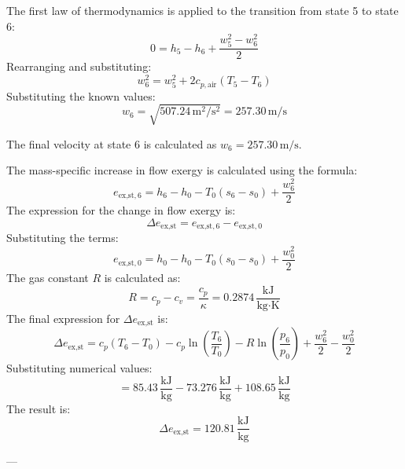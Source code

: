 The first law of thermodynamics is applied to the transition from state 5 to state 6:  
\[
0 = h_5 - h_6 + \frac{w_5^2 - w_6^2}{2}
\]  
Rearranging and substituting:  
\[
w_6^2 = w_5^2 + 2 c_{p,\text{air}} (T_5 - T_6)
\]  
Substituting the known values:  
\[
w_6 = \sqrt{507.24 \, \text{m}^2/\text{s}^2} = 257.30 \, \text{m/s}
\]  

The final velocity at state 6 is calculated as \( w_6 = 257.30 \, \text{m/s} \).

The mass-specific increase in flow exergy is calculated using the formula:  
\[
e_{\text{ex,st},6} = h_6 - h_0 - T_0 (s_6 - s_0) + \frac{w_6^2}{2}
\]  
The expression for the change in flow exergy is:  
\[
\Delta e_{\text{ex,st}} = e_{\text{ex,st},6} - e_{\text{ex,st},0}
\]  
Substituting the terms:  
\[
e_{\text{ex,st},0} = h_0 - h_0 - T_0 (s_0 - s_0) + \frac{w_0^2}{2}
\]  
The gas constant \( R \) is calculated as:  
\[
R = c_p - c_v = \frac{c_p}{\kappa} = 0.2874 \, \frac{\text{kJ}}{\text{kg·K}}
\]  
The final expression for \( \Delta e_{\text{ex,st}} \) is:  
\[
\Delta e_{\text{ex,st}} = c_p (T_6 - T_0) - c_p \ln \left( \frac{T_6}{T_0} \right) - R \ln \left( \frac{p_6}{p_0} \right) + \frac{w_6^2}{2} - \frac{w_0^2}{2}
\]  
Substituting numerical values:  
\[
= 85.43 \, \frac{\text{kJ}}{\text{kg}} - 73.276 \, \frac{\text{kJ}}{\text{kg}} + 108.65 \, \frac{\text{kJ}}{\text{kg}}
\]  
The result is:  
\[
\Delta e_{\text{ex,st}} = 120.81 \, \frac{\text{kJ}}{\text{kg}}
\]  

---